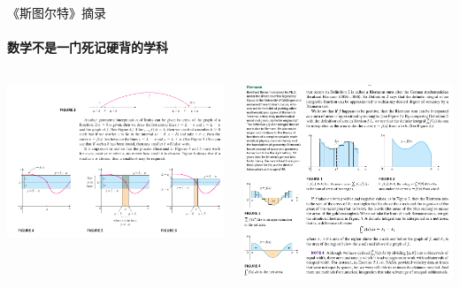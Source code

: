 \documentclass{beamer}
\begin{document}
\begin{frame}{《斯图尔特》摘录}
\framesubtitle{数学不是一门死记硬背的学科}
    \begin{columns}
        \begin{column}{0.3\textwidth} %
            \centering
            \includegraphics[width=\textwidth]{assets/calculus.png}
        \end{column}
        \begin{column}{0.3\textwidth} %
            \centering
            \includegraphics[width=\textwidth]{assets/calculus2.png}

\end{column}
\end{columns}
\end{frame}
\end{document}
